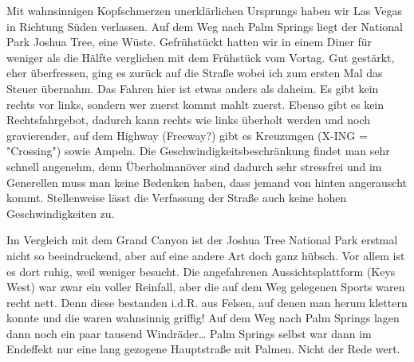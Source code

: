 Mit wahnsinnigen Kopfschmerzen unerklärlichen Ursprungs haben wir Las Vegas in Richtung Süden verlassen.
Auf dem Weg nach Palm Springs liegt der National Park Joshua Tree, eine Wüste. Gefrühstückt hatten wir in einem Diner für weniger als die Hälfte verglichen mit dem Frühstück vom Vortag.
Gut gestärkt, eher überfressen, ging es zurück auf die Straße wobei ich zum ersten Mal das Steuer übernahm.
Das Fahren hier ist etwas anders als daheim. Es gibt kein rechts vor links, sondern wer zuerst kommt mahlt zuerst.
Ebenso gibt es kein Rechtsfahrgebot, dadurch kann rechts wie links überholt werden und noch gravierender, auf dem Highway (Freeway?) gibt es Kreuzungen (X-ING = "Crossing") sowie Ampeln.
Die Geschwindigkeitsbeschränkung findet man sehr schnell angenehm, denn Überholmanöver sind dadurch sehr stressfrei und im Generellen muss man keine Bedenken haben, dass jemand von hinten angerauscht kommt.
Stellenweise lässt die Verfassung der Straße auch keine hohen Geschwindigkeiten zu.

Im Vergleich mit dem Grand Canyon ist der Joshua Tree National Park erstmal nicht so beeindruckend, aber auf eine andere Art doch ganz hübsch.
Vor allem ist es dort ruhig, weil weniger besucht.
Die angefahrenen Aussichtsplattform (Keys West) war zwar ein voller Reinfall, aber die auf dem Weg gelegenen Sports waren recht nett.
Denn diese bestanden i.d.R. aus Felsen, auf denen man herum klettern konnte und die waren wahnsinnig griffig!
Auf dem Weg nach Palm Springs lagen dann noch ein paar tausend Windräder\dots
Palm Springs selbst war dann im Endeffekt nur eine lang gezogene Hauptstraße mit Palmen.
Nicht der Rede wert.
